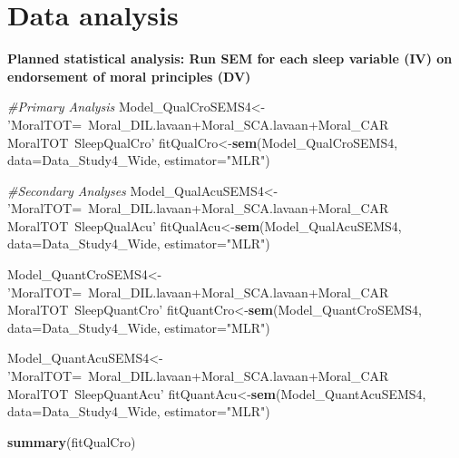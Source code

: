 \documentclass[
]{book}
\newenvironment{Shaded}{\begin{snugshade}}{\end{snugshade}}
\newcommand{\CommentTok}[1]{\textcolor[rgb]{0.56,0.35,0.01}{\textit{#1}}}
\newcommand{\DataTypeTok}[1]{\textcolor[rgb]{0.13,0.29,0.53}{#1}}
\newcommand{\DecValTok}[1]{\textcolor[rgb]{0.00,0.00,0.81}{#1}}
\newcommand{\KeywordTok}[1]{\textcolor[rgb]{0.13,0.29,0.53}{\textbf{#1}}}
\newcommand{\NormalTok}[1]{#1}
\newcommand{\OperatorTok}[1]{\textcolor[rgb]{0.81,0.36,0.00}{\textbf{#1}}}
\newcommand{\StringTok}[1]{\textcolor[rgb]{0.31,0.60,0.02}{#1}}
\begin{document}
\begin{Shaded}
\end{Shaded}

\hypertarget{data-analysis-3}{%
\section{Data analysis}\label{data-analysis-3}}

\textbf{Planned statistical analysis: Run SEM for each sleep variable (IV) on endorsement of moral principles (DV)}

\begin{Shaded}
\begin{Highlighting}[]
\CommentTok{#Primary Analysis}
\NormalTok{Model_QualCroSEMS4<-}
\StringTok{'MoralTOT=~Moral_DIL.lavaan+Moral_SCA.lavaan+Moral_CAR}
\StringTok{MoralTOT~SleepQualCro'}
\NormalTok{fitQualCro<-}\KeywordTok{sem}\NormalTok{(Model_QualCroSEMS4, }\DataTypeTok{data=}\NormalTok{Data_Study4_Wide, }\DataTypeTok{estimator=}\StringTok{"MLR"}\NormalTok{)}

\CommentTok{#Secondary Analyses}
\NormalTok{Model_QualAcuSEMS4<-}
\StringTok{'MoralTOT=~Moral_DIL.lavaan+Moral_SCA.lavaan+Moral_CAR}
\StringTok{MoralTOT~SleepQualAcu'}
\NormalTok{fitQualAcu<-}\KeywordTok{sem}\NormalTok{(Model_QualAcuSEMS4, }\DataTypeTok{data=}\NormalTok{Data_Study4_Wide, }\DataTypeTok{estimator=}\StringTok{"MLR"}\NormalTok{)}


\NormalTok{Model_QuantCroSEMS4<-}
\StringTok{'MoralTOT=~Moral_DIL.lavaan+Moral_SCA.lavaan+Moral_CAR}
\StringTok{MoralTOT~SleepQuantCro'}
\NormalTok{fitQuantCro<-}\KeywordTok{sem}\NormalTok{(Model_QuantCroSEMS4, }\DataTypeTok{data=}\NormalTok{Data_Study4_Wide, }\DataTypeTok{estimator=}\StringTok{"MLR"}\NormalTok{)}


\NormalTok{Model_QuantAcuSEMS4<-}
\StringTok{'MoralTOT=~Moral_DIL.lavaan+Moral_SCA.lavaan+Moral_CAR}
\StringTok{MoralTOT~SleepQuantAcu'}
\NormalTok{fitQuantAcu<-}\KeywordTok{sem}\NormalTok{(Model_QuantAcuSEMS4, }\DataTypeTok{data=}\NormalTok{Data_Study4_Wide, }\DataTypeTok{estimator=}\StringTok{"MLR"}\NormalTok{)}


\KeywordTok{summary}\NormalTok{(fitQualCro)}
\end{Highlighting}
\end{Shaded}
\end{document}
